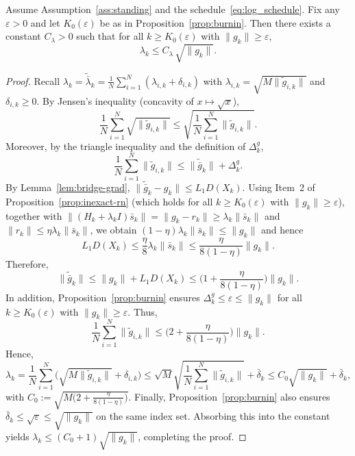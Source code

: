 \documentclass[review,onefignum,onetabnum]{siamart171218}
\begin{document}
	\begin{lemma}\label{lem:lambda_scaling}
		Assume Assumption~\ref{ass:standing} and the schedule~\eqref{eq:log_schedule}.
		Fix any $\varepsilon>0$ and let $K_0(\varepsilon)$ be as in Proposition~\ref{prop:burnin}.
		Then there exists a constant $C_\lambda>0$ such that for all $k\ge K_0(\varepsilon)$ with $\|g_k\|\ge \varepsilon$,
		\[
		\lambda_k\le C_\lambda\,\sqrt{\|g_k\|}.
		\]
	\end{lemma}
	\begin{proof}
		Recall $\lambda_k=\tilde{\bar\lambda}_k=\frac1N\sum_{i=1}^N(\lambda_{i,k}+\delta_{i,k})$ with
		$\lambda_{i,k}=\sqrt{M\|\tilde g_{i,k}\|}$ and $\delta_{i,k}\ge 0$.
		By Jensen's inequality (concavity of $x\mapsto\sqrt{x}$),
		\[
		\frac1N\sum_{i=1}^N \sqrt{\|\tilde g_{i,k}\|}
		\le \sqrt{\frac1N\sum_{i=1}^N \|\tilde g_{i,k}\|}.
		\]
		Moreover, by the triangle inequality and the definition of $\Delta_k^g$,
		\[
		\frac1N\sum_{i=1}^N \|\tilde g_{i,k}\|
		\le \|\tilde{\bar g}_k\|+\Delta_k^g.
		\]
		By Lemma~\ref{lem:bridge-grad}, $\|\tilde{\bar g}_k-g_k\|\le L_1D(X_k)$.
		Using Item~2 of Proposition~\ref{prop:inexact-rn} (which holds for all $k\ge K_0(\varepsilon)$ with $\|g_k\|\ge \varepsilon$),
		together with $\|(H_k+\lambda_k I)\bar s_k\|=\|g_k-r_k\|\ge \lambda_k\|\bar s_k\|$ and $\|r_k\|\le \eta\lambda_k\|\bar s_k\|$,
		we obtain $(1-\eta)\lambda_k\|\bar s_k\|\le \|g_k\|$ and hence
		\[
		L_1D(X_k)\le \frac{\eta}{8}\lambda_k\|\bar s_k\|\le \frac{\eta}{8(1-\eta)}\|g_k\|.
		\]
		Therefore,
		\[
		\|\tilde{\bar g}_k\|\le \|g_k\|+L_1D(X_k)\le \Big(1+\frac{\eta}{8(1-\eta)}\Big)\|g_k\|.
		\]
		In addition, Proposition~\ref{prop:burnin} ensures $\Delta_k^g\le \varepsilon\le \|g_k\|$ for all $k\ge K_0(\varepsilon)$ with $\|g_k\|\ge \varepsilon$.
		Thus,
		\[
		\frac1N\sum_{i=1}^N \|\tilde g_{i,k}\|
		\le \Big(2+\frac{\eta}{8(1-\eta)}\Big)\|g_k\|.
		\]
		Hence,
		\[
		\lambda_k
		= \frac1N\sum_{i=1}^N\big(\sqrt{M\|\tilde g_{i,k}\|}+\delta_{i,k}\big)
		\le \sqrt{M}\sqrt{\frac1N\sum_{i=1}^N \|\tilde g_{i,k}\|}+\bar\delta_k
		\le C_0\sqrt{\|g_k\|}+\bar\delta_k,
		\]
		with $C_0:=\sqrt{M\big(2+\frac{\eta}{8(1-\eta)}\big)}$.
		Finally, Proposition~\ref{prop:burnin} also ensures $\bar\delta_k\le \sqrt{\varepsilon}\le \sqrt{\|g_k\|}$ on the same index set.
		Absorbing this into the constant yields $\lambda_k\le (C_0+1)\sqrt{\|g_k\|}$, completing the proof.
	\end{proof}
	
\end{document}

